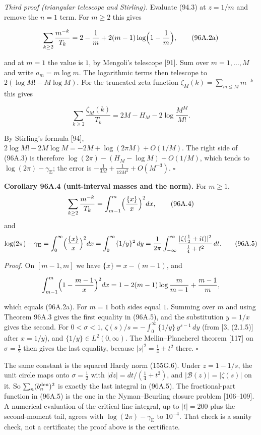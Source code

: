 \documentclass[
  11pt,
]{book}
\renewenvironment{quote}
  {\begin{tcolorbox}[
      enhanced,
      breakable,
      colback=tncream,
      colframe=tnrust,
      boxrule=0.8pt,
      arc=1.5pt,
      left=7pt,
      right=7pt,
      top=6pt,
      bottom=6pt]}
  {\end{tcolorbox}}
\begin{document}
\emph{Third proof (triangular telescope and Stirling).} Evaluate (94.3)
at \(z=1/m\) and remove the \(n=1\) term. For \(m\ge2\) this gives

\[
\sum_{k\ge2}\frac{m^{-k}}{T_k}=2-\frac1m+2(m-1)\log\Bigl(1-\frac1m\Bigr),
\tag{96A.2a}
\]

and at \(m=1\) the value is \(1\), by Mengoli's telescope {[}91{]}. Sum
over \(m=1,\ldots,M\) and write \(a_m=m\log m\). The logarithmic terms
then telescope to \(2(\log M!-M\log M)\). For the truncated zeta
function \(\zeta_M(k)=\sum_{m\le M}m^{-k}\) this gives

\[
\boxed{\sum_{k\ge2}\frac{\zeta_M(k)}{T_k}=2M-H_M-2\log\frac{M^M}{M!}.}
\tag{96A.3}
\]

By Stirling's formula {[}94{]},
\(2\log M!-2M\log M=-2M+\log(2\pi M)+O(1/M)\). The right side of (96A.3)
is therefore \(\log(2\pi)-(H_M-\log M)+O(1/M)\), which tends to
\(\log(2\pi)-\gamma_{\mathrm E}\); the error is
\(-\frac1{3M}+\frac1{12M^2}+O(M^{-3})\). \(\square\)

\begin{quote}
\textbf{Corollary 96A.4 (unit-interval masses and the norm).} For
\(m\ge1\), \[
\sum_{k\ge2}\frac{m^{-k}}{T_k}=\int_{m-1}^{m}\Bigl(\frac{\{x\}}x\Bigr)^2dx,
\tag{96A.4}
\] and \[
\log(2\pi)-\gamma_{\mathrm E}
=\int_0^\infty\Bigl(\frac{\{x\}}x\Bigr)^2dx
=\int_0^\infty\{1/y\}^2\,dy
=\frac1{2\pi}\int_{-\infty}^{\infty}\frac{|\zeta(\tfrac12+it)|^2}{\tfrac14+t^2}\,dt.
\tag{96A.5}
\]
\end{quote}

\emph{Proof.} On \([m-1,m]\) we have \(\{x\}=x-(m-1)\), and

\[
\int_{m-1}^{m}\Bigl(1-\frac{m-1}{x}\Bigr)^2dx
=1-2(m-1)\log\frac m{m-1}+\frac{m-1}m,
\]

which equals (96A.2a). For \(m=1\) both sides equal \(1\). Summing over
\(m\) and using Theorem 96A.3 gives the first equality in (96A.5), and
the substitution \(y=1/x\) gives the second. For \(0<\sigma<1\),
\(\zeta(s)/s=-\int_0^\infty\{1/y\}\,y^{s-1}\,dy\) (from {[}3, (2.1.5){]}
after \(x=1/y\)), and \(\{1/y\}\in L^2(0,\infty)\). The
Mellin--Plancherel theorem {[}117{]} on \(\sigma=\tfrac12\) then gives
the last equality, because \(|s|^2=\tfrac14+t^2\) there. \(\square\)

The same constant is the squared Hardy norm (155G.6). Under \(z=1-1/s\),
the unit circle maps onto \(\sigma=\tfrac12\) with
\(|dz|=dt/(\tfrac14+t^2)\), and \(|\mathcal B(z)|=|\zeta(s)|\) on it. So
\(\sum_n(b_n^{\rm den})^2\) is exactly the last integral in (96A.5). The
fractional-part function in (96A.5) is the one in the Nyman--Beurling
closure problem {[}106--109{]}. A numerical evaluation of the
critical-line integral, up to \(|t|=200\) plus the second-moment tail,
agrees with \(\log(2\pi)-\gamma_{\mathrm E}\) to \(10^{-4}\). That check
is a sanity check, not a certificate; the proof above is the
certificate.
\end{document}
